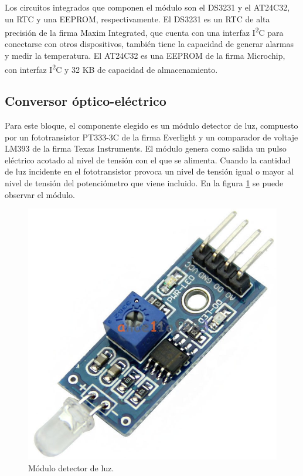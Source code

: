 
Los circuitos integrados que componen el módulo son el DS3231 y el AT24C32, un RTC y una EEPROM, respectivamente. El DS3231 es un RTC de alta precisión de la firma Maxim Integrated, que cuenta con una interfaz I\textsuperscript{2}C para conectarse con otros dispositivos, también tiene la capacidad de generar alarmas y medir la temperatura. El AT24C32 es una EEPROM de la firma Microchip, con interfaz I\textsuperscript{2}C y 32 KB de capacidad de almacenamiento.

\subsection{Conversor óptico-eléctrico}

Para este bloque, el componente elegido es un módulo detector de luz, compuesto por un fototransistor PT333-3C de la firma Everlight y un comparador de voltaje LM393 de la firma Texas Instruments. El módulo genera como salida un pulso eléctrico acotado al nivel de tensión con el que se alimenta. Cuando la cantidad de luz incidente en el fototransistor provoca un nivel de tensión igual o mayor al nivel de tensión del potenciómetro que viene incluido. En la figura \ref{fig:coeModule} se puede observar el módulo.

\begin{figure}[h]
	\centering
	\includegraphics[scale=0.2]{./Figures/coe.jpg}
	\caption{Módulo detector de luz\protect\footnotemark.}
		\label{fig:coeModule}
\end{figure}

